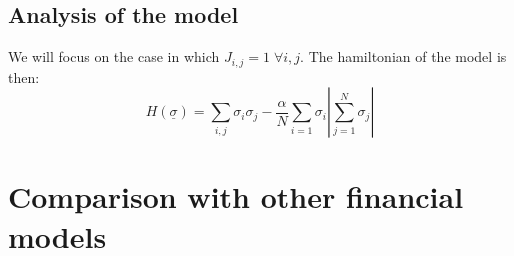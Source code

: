 \subsection{Analysis of the model}
We will focus on the case in which \(J_{i,j}=1 \; \forall i,j\). The hamiltonian of the model is then:
\begin{equation}
    H(\underline{\sigma}) = \sum_{i,j}\sigma_i\sigma_j - \frac{\alpha}{N}\sum_{i=1} \sigma_i \left | \sum_{j=1}^N \sigma_j \right |
\end{equation}

\section{Comparison with other financial models}
